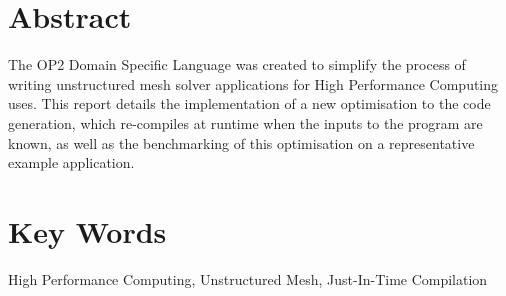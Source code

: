 
%
\vspace*{\fill}
\begin{adjustwidth}{60pt}{60pt}
\begin{center}
\section*{Abstract}
\normalsize
The OP2 Domain Specific Language was created to simplify the process of writing unstructured mesh solver applications for High Performance Computing uses. This report details the implementation of a new optimisation to the code generation, which re-compiles at runtime when the inputs to the program are known, as well as the benchmarking of this optimisation on a representative example application. 
\section*{Key Words}
High Performance Computing, Unstructured Mesh, Just-In-Time Compilation
\end{center}
\end{adjustwidth}
\vspace*{\fill}
